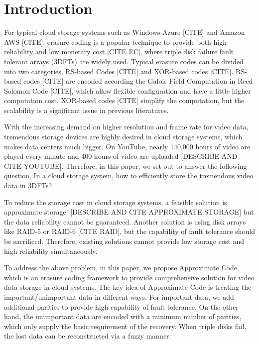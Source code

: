 \documentclass[sigconf]{acmart}
\begin{document}
%
%

\maketitle

\section{Introduction}
For typical cloud storage systems such as Windows Azure [CITE] and Amazon AWS [CITE], erasure coding is a popular technique to provide both high reliability and low monetary cost [CITE EC], where triple disk failure fault tolerant arrays (3DFTs) are widely used. Typical erasure codes can be divided into two categories, RS-based Codes [CITE] and XOR-based codes [CITE]. RS-based codes [CITE] are encoded according the Galois Field Computation in Reed Solomon Code [CITE], which allow flexible configuration and have a little higher computation cost. XOR-based codes [CITE] simplify the computation, but the scalability is a significant issue in previous literatures.

With the increasing demand on higher resolution and frame rate for video data, tremendous storage devices are highly desired in cloud storage systems, which makes data centers much bigger. On YouTube, nearly 140,000 hours of video are played every minute and 400 hours of video are uploaded [DESCRIBE AND CITE YOUTUBE]. Therefore, in this paper, we set out to answer the following question,
In a cloud storage system, how to efficiently store the tremendous video data in 3DFTs?

To reduce the storage cost in cloud storage systems, a feasible solution is approximate storage. [DESCRIBE AND CITE APPROXIMATE STORAGE] but the data reliability cannot be guaranteed. Another solution is using disk arrays like RAID-5 or RAID-6 [CITE RAID], but the capability of fault tolerance should be sacrificed. Therefore, existing solutions cannot provide low storage cost and high reliability simultaneously.

To address the above problem, in this paper, we propose Approximate Code, which is an erasure coding framework to provide comprehensive solution for video data storage in cloud systems. The key idea of Approximate Code is treating the important/unimportant data in different ways. For important data, we add additional parities to provide high capability of fault tolerance. On the other hand, the unimportant data are encoded with a minimum number of parities, which only supply the basic requirement of the recovery. When triple disks fail, the lost data can be reconstructed via a fuzzy manner.
\end{document}
